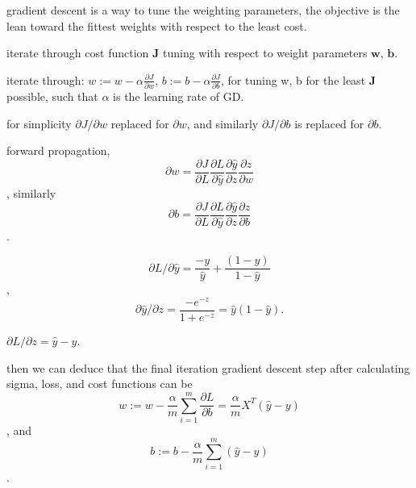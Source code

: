 \documentclass[4apaper,12pt]{book}
\begin{document}
\begin{description}

\item gradient descent is a way to tune the weighting parameters, the objective is the lean toward the fittest weights with respect to the least cost.
\item iterate through cost function $\mathbf{J}$ tuning with respect to weight parameters  $\mathbf{w}$, $\mathbf{b}$.
\item iterate through: $w:=w-\alpha\frac{\partial{J}}{\partial{w}}$,  $b:=b-\alpha\frac{\partial{J}}{\partial{b}}$, for tuning w, b for the least $\mathbf{J}$ possible, such that $\alpha$ is the learning rate of GD.
\item for simplicity $\partial{J}/\partial{w}$ replaced for $\partial{w}$, and similarly $\partial{J}/\partial{b}$ is replaced for $\partial{b}$.
\item forward propagation, $$\partial w = \frac{\partial{J}}{\partial{L}}\frac{\partial{L}}{\partial{\hat{y}}}\frac{\partial{\hat{y}}}{\partial{z}}\frac{\partial{z}}{\partial{w}}$$, similarly $$\partial b = \frac{\partial{J}}{\partial{L}}\frac{\partial{L}}{\partial{\hat{y}}}\frac{\partial{\hat{y}}}{\partial{z}}\frac{\partial{z}}{\partial{b}}$$.
\item $$\partial{L}/\partial{\hat{y}}=\frac{-y}{\hat{y}} + \frac{(1-y)}{1-\hat{y}}$$, $$\partial{\hat{y}}/\partial{z}=\frac{-e^{-z}}{1+e^{-z}} = \hat{y}(1-\hat{y}).$$
\item $\partial{L}/\partial{z}=\hat{y}-y$.
\item then we can deduce that the final iteration gradient descent step after calculating sigma, loss, and cost functions can be  $$w:=w-\frac{\alpha}{m}\sum_{i=1}^m\frac{\partial{L}}{\partial{b}}=\frac{\alpha}{m}X^T(\hat{y}-y)$$, and $$b:=b-\frac{\alpha}{m}\sum_{i=1}^{m}(\hat{y}-y)$$.
\end{description}
\end{document}
